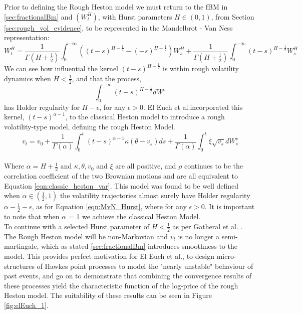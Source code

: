 \documentclass[12pt,oneside]{article}
\begin{document}
Prior to defining the Rough Heston model we must return to the fBM in \ref{sec:fractionalBm} and $(\textit{$W^H_t$})$, with Hurst parameters $\textit{H} \in (0,1)$, from Section  \ref{sec:rough_vol_evidence}, to be represented in the Mandelbrot - Van Ness representation:
\\

\begin{equation}
\label{eqn:MvN_Hurst}
{W^H_t} = \frac{1}{\Gamma(H + \frac{1}{2})} \int_{0}^{-\infty} ((t-s)^{H-\frac{1}{2}} - (-s)^{H - \frac{1}{2}})W^H_s + \frac{1}{\Gamma(H + \frac{1}{2})} \int_{0}^{-\infty} (t-s)^{H-\frac{1}{2}}W^H_s
\end{equation}
We can see how influential  the kernel  $(t-s)^{H-\frac{1}{2}}$ is within rough volatility dynamics when $H<\frac{1}{2}$, and that the process,
$$\int_{0}^{-\infty} (t-s)^{H-\frac{1}{2}} dW^s$$
has Holder regularity for $H - \epsilon$, for any $\epsilon>0$. El Euch et al.incorporated this kernel, $(t-s)^{\alpha-1}$, to the classical Heston model to introduce a rough volatility-type model, defining the rough Heston Model.
\\

\begin{equation}
\label{eqn:rough_heston}
v_t = v_0 + \frac{1}{\Gamma(\alpha)} \int_{0}^{t} (t-s)^{\alpha-1} \kappa (\theta - v_s)ds + \frac{1}{\Gamma(\alpha)} \int_{0}^{t} \xi\sqrt{v_s}dW_s^{v}
\end{equation}
\\

Where $\alpha = H+\frac{1}{2}$ and $\kappa, \theta, v_0$ and $\xi$ are all positive, and $\rho$ continues to be the correlation coefficient of the two Brownian motions and are all equivalent to Equation \ref{eqn:classic_heston_var}. This model was found to be well defined when ${\alpha} \in (\frac{1}{2},1)$ the volatility trajectories almost surely have Holder regularity $\alpha - \frac{1}{2} -\epsilon$, as for Equation \ref{eqn:MvN_Hurst}, where for any $\epsilon>0$. It is important to note that when $\alpha$ = 1 we achieve the classical Heston Model.
\\

To continue with a selected Hurst parameter of $H < \frac{1}{2}$ as per Gatheral et al.  \cite{gatheral2014volatility}. The Rough Heston model will be non-Markovian and $v_t$ is no longer a semi-martingale, which as stated \ref{sec:fractionalBm} introduces smoothness to the model. This provides perfect motivation for El Euch et al., to design micro-structures of Hawkes point processes to model the "nearly unstable" behaviour of past events, and go on to demonstrate that combining the convergence results of these processes yield the characteristic function of the log-price of the rough Heston model. The suitability of these results can be seen in Figure \ref{fig:elEuch_1}.
\\
\end{document}
